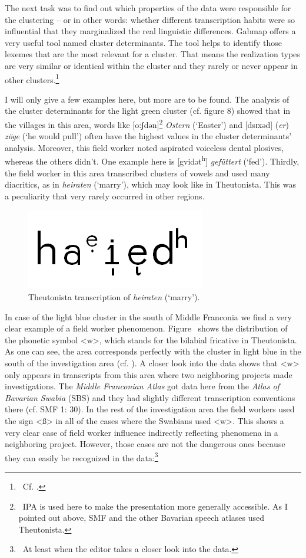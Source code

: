 \documentclass[output=paper]{LSP/langsci}
\begin{document}
The next task was to find out which properties of the data were responsible for the clustering – or in other words: whether  different transcription habits were so influential that they marginalized the real linguistic differences. Gabmap offers a very useful tool named cluster determinants. The tool helps to identify those lexemes that are the most relevant for a cluster. That means the realization types are very similar or identical within the cluster and they rarely or never appear in other clusters.\footnote{\ Cf. \citet{nerbonne_gabmap_2011}.}

I will only give a few examples here, but more are to be found. The analysis of the cluster determinants for the light green cluster (cf. figure 8) showed that in the villages in this area, words like [o:ʃdən]\footnote{\ IPA is used here to make the presentation more generally accessible. As I pointed out above, SMF and the other Bavarian speech atlases used Theutonista.} \textit{Ostern} (`Easter') and [dsɪxəd] (\textit{er}) \textit{zöge} (`he would pull') often have the highest values in the cluster determinants' analysis. Moreover, this field worker noted aspirated voiceless dental plosives, whereas the others didn't. One example here is [gvidət\textsuperscript{h}] \textit{gefüttert} (`fed'). Thirdly, the field worker in this area transcribed clusters of vowels and used many diacritics, as in \textit{heiraten} (`marry'), which may look like  in Theutonista. This was a peculiarity that very rarely occurred in other regions.

\begin{figure}[t]
\includegraphics[width=.25\textwidth]{illustrations/mathus_fig9}
\caption{Theutonista transcription of \textit{heiraten} (`marry').}
\label{fig:mathus:9}
\end{figure}


In case of the light blue cluster in the south of Middle Franconia we find a very clear example of a field worker phenomenon. Figure~ shows the distribution of the phonetic symbol {\textless}w{\textgreater}, which stands for the bilabial fricative in Theutonista. As one can see, the area corresponds perfectly with the cluster in light blue in the south of the investigation area (cf. ). A closer look into the data shows that {\textless}w{\textgreater} only appears in transcripts from this area where two neighboring projects made investigations. The \textit{Middle Franconian Atlas} got data here from the \textit{Atlas of Bavarian Swabia} (SBS) and they had slightly different transcription conventions there (cf. SMF 1: 30). In the rest of the investigation area the field workers used the sign {\textless}ß{\textgreater} in all of the cases where the Swabians used {\textless}w{\textgreater}. This shows a very clear case of field worker influence indirectly reflecting phenomena in a neighboring project. However, those cases are not the dangerous ones because they can easily be recognized in the data:\footnote{\ At least when the editor takes a closer look into the data.}
\end{document}
